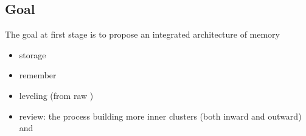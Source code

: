 \subsection{Goal}
The goal at first stage is to propose an integrated architecture of memory
\begin{itemize}
    \begin{itemize}
        \item storage
        \item remember
        \item leveling (from raw )
        \item review: the process building more inner clusters (both inward and outward) and
    \end{itemize}
\end{itemize}